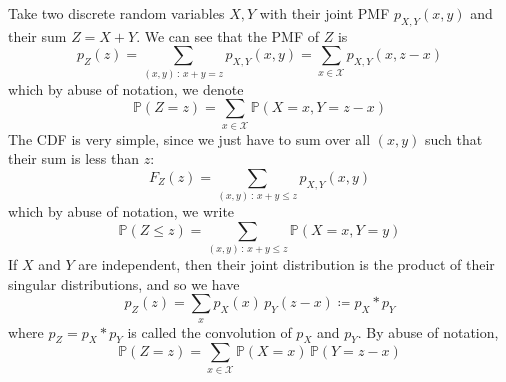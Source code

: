 \documentclass{article}
\begin{document}
      \begin{definition}
        Take two discrete random variables $X, Y$ with their joint PMF $p_{X, Y} (x, y)$ and their sum $Z = X + Y$. We can see that the PMF of $Z$ is 
        \begin{equation}
          p_Z (z) = \sum_{(x, y) \,:\, x + y = z} p_{X, Y} (x, y) = \sum_{x \in \mathcal{X}} p_{X, Y} (x, z - x)
        \end{equation}
        which by abuse of notation, we denote
        \begin{equation}
          \mathbb{P}(Z = z) = \sum_{x \in \mathcal{X}} \mathbb{P}(X = x, Y = z - x)
        \end{equation}
        The CDF is very simple, since we just have to sum over all $(x, y)$ such that their sum is less than $z$: 
        \begin{equation}
          F_Z (z) = \sum_{(x, y) \,:\, x + y \leq z} p_{X, Y} (x, y)
        \end{equation}
        which by abuse of notation, we write 
        \begin{equation}
          \mathbb{P}(Z \leq z) = \sum_{(x, y) \,:\, x + y \leq z} \mathbb{P}(X = x, Y = y)
        \end{equation}
        If $X$ and $Y$ are independent, then their joint distribution is the product of their singular distributions, and so we have 
        \begin{equation}
          p_Z (z) = \sum_x p_X (x) \, p_Y (z - x) \coloneqq p_X \ast p_Y
        \end{equation}
        where $p_Z = p_X \ast p_Y$ is called the convolution of $p_X$ and $p_Y$. By abuse of notation, 
        \begin{equation}
          \mathbb{P}(Z = z) = \sum_{x \in \mathcal{X}} \mathbb{P}(X = x) \, \mathbb{P}(Y = z - x)
        \end{equation}
      \end{definition}
\end{document}
